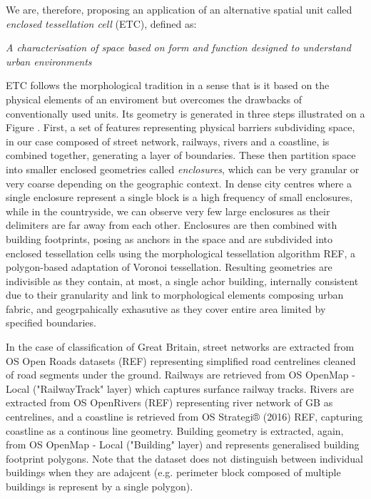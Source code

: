 We are, therefore, proposing an application of an alternative spatial unit called \textit{enclosed
tessellation cell} (ETC), defined as:

\textit{A characterisation of space based on form and function designed to understand urban
environments}


ETC follows the morphological tradition in a sense that is it
based on the physical elements of an enviroment but overcomes the drawbacks of
conventionally used units. Its geometry is generated in three steps illustrated on a
Figure
. First, a set of features representing physical barriers
subdividing space, in our case composed of street network, railways, rivers and a
coastline, is combined together, generating a layer of boundaries. These then partition space
into smaller enclosed geometries called \textit{enclosures}, which can be very granular
or very coarse depending on the geographic context. In dense city centres where a single
enclosure represent a single block is a high frequency of small enclosures, while in the
countryside, we can observe very few large enclosures as their delimiters are far away
from each other. Enclosures are then combined with building footprints, posing as
anchors in the space and are subdivided into enclosed tessellation cells using the
morphological tessellation algorithm REF, a polygon-based adaptation of Voronoi
tessellation. Resulting geometries are indivisible as they contain, at most, a single
achor building, internally consistent due to their granularity and link to morphological
elements composing urban fabric, and geogrpahically exhasutive as they cover entire area
limited by specified boundaries.


In the case of classification of Great Britain, street networks are extracted from OS
Open Roads datasets (REF) representing simplified road centrelines cleaned of road
segments under the ground. Railways are retrieved from OS OpenMap - Local
("RailwayTrack" layer) which captures surfance railway tracks. Rivers are extracted from
OS OpenRivers (REF) representing river network of GB as centrelines, and a coastline is
retrieved from OS Strategi® (2016) REF, capturing  coastline as a continous line
geometry. Building geometry is extracted, again, from OS OpenMap - Local ("Building"
layer) and represents generalised building footprint polygons. Note that the dataset
does not distinguish between individual buildings when they are adajcent (e.g. perimeter
block composed of multiple buildings is represent by a single polygon).

